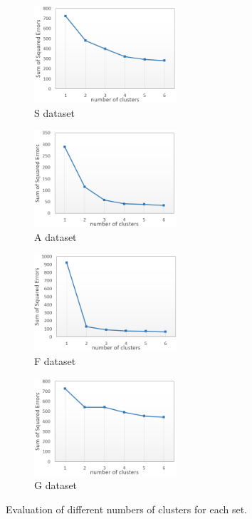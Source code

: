 \begin{figure}[ht]
	\centering
	\begin{subfigure}[b]{0.4\linewidth}
		\centering
		\includegraphics[width=150pt]{figures/Scluster_new4.png}
		\caption{S dataset}
		\label{fig:numS}
	\end{subfigure}
	\begin{subfigure}[b]{0.4\linewidth}
		\centering
		\includegraphics[width=150pt]{figures/Acluster_new4.png}
		\caption{A dataset}
		\label{fig:numA}
	\end{subfigure}
	\begin{subfigure}[b]{0.4\linewidth}
		\centering
		\includegraphics[width=150pt]{figures/Fcluster_new4.png}
		\caption{F dataset}
		\label{fig:numF}
	\end{subfigure}
	\begin{subfigure}[b]{0.4\linewidth}
		\centering
		\includegraphics[width=150pt]{figures/Gcluster_new4.png}
		\caption{G dataset}
		\label{fig:numG}
	\end{subfigure}
	\caption{Evaluation of different numbers of clusters for each set.}
	\label{fig:cluster_evaluation}
\end{figure}


